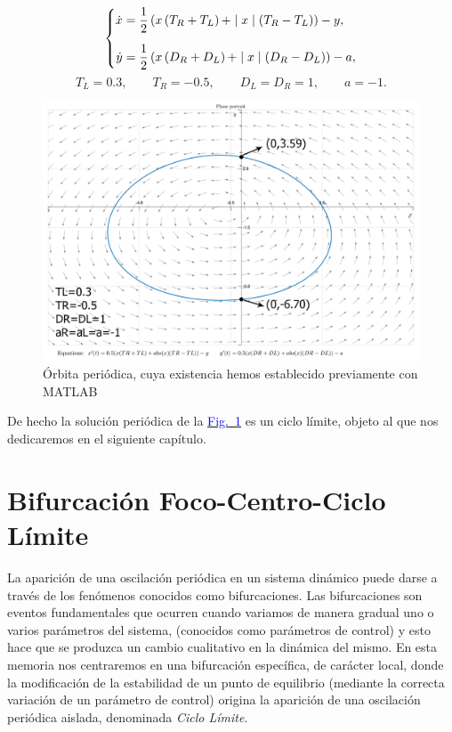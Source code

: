 \documentclass[12pt,a4paper]{report} %
\newcommand{\fref}[1]{\hyperref[#1]{\textcolor{blue}{Fig.~\ref*{#1}}}}
\begin{document}
	\begin{equation}
		\label{eq:clejem}
		\scalebox{1}{$\displaystyle
			\left\{
			\begin{aligned}
			\dot{x}&=\frac{1}{2}\left( x\left(T_R+T_L\right)+\mid x\mid \left(T_R-T_L\right)\right)-y,
				 \\[2mm]
			\dot{y}&=\frac{1}{2}\left( x\left(D_R+D_L\right)+\mid x\mid \left(D_R-D_L\right)\right)-a,
			\end{aligned}
			\right. 
			$}
	\end{equation}\smallskip
	\begin{equation*}
		T_L=0.3, \qquad T_R=-0.5, \qquad D_L=D_R=1, \qquad a=-1.
	\end{equation*}\smallskip
	
	\begin{figure}[h]
		\centering
		\includegraphics[width=1\textwidth]{clejemplo.jpg}
		\caption{Órbita periódica, cuya existencia hemos establecido previamente con MATLAB}
		\label{fig:clejemplo}
	\end{figure}\smallskip
	
	\vspace{0.5cm} De hecho la solución periódica de la \fref{fig:clejemplo} es un ciclo límite, objeto al que nos dedicaremos en el siguiente capítulo.
	
	\newpage
	
	\chapter{Bifurcación Foco-Centro-Ciclo Límite}
	\label{cap.5}

	La aparición de una oscilación periódica en un sistema dinámico puede darse a través de los fenómenos conocidos como bifurcaciones. Las bifurcaciones son eventos fundamentales que ocurren cuando variamos de manera gradual uno o varios parámetros del sistema, (conocidos como parámetros de control) y esto hace que se produzca un cambio cualitativo en la dinámica del mismo. En esta memoria nos centraremos en una bifurcación específica, de carácter local, donde la modificación de la estabilidad de un punto de equilibrio (mediante la correcta variación de un parámetro de control) origina la aparición de una oscilación periódica aislada, denominada \textit{Ciclo Límite}.
\end{document}

